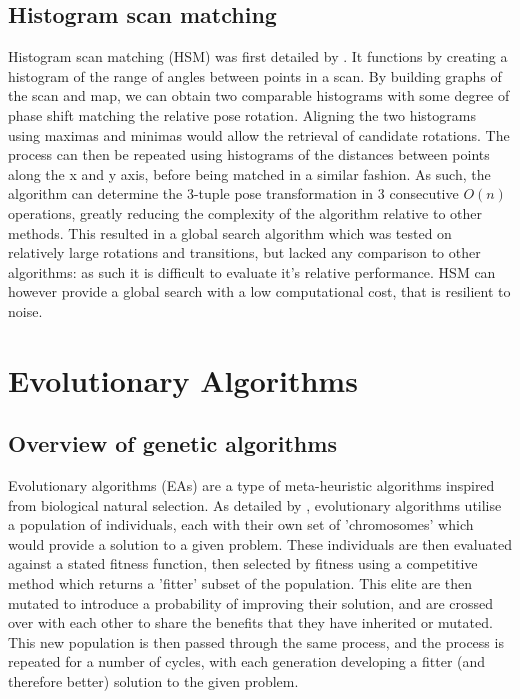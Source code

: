 \documentclass[authoryearcitations]{UoYCSproject}
\begin{document}
\subsection{Histogram scan matching}
Histogram scan matching (HSM) was first detailed by \citet{Weiss1994-ub}. It functions by creating a histogram of the range of angles between points in a scan. By building graphs of the scan and map, we can obtain two comparable histograms with some degree of phase shift matching the relative pose rotation. Aligning the two histograms using maximas and minimas would allow the retrieval of candidate rotations. The process can then be repeated using histograms of the distances between points along the x and y axis, before being matched in a similar fashion. As such, the algorithm can determine the 3-tuple pose transformation in 3 consecutive $O(n)$ operations, greatly reducing the complexity of the algorithm relative to other methods. This resulted in a global search algorithm which was tested on relatively large rotations and transitions, but lacked any comparison to other algorithms: as such it is difficult to evaluate it's relative performance. HSM can however provide a global search with a low computational cost, that is resilient to noise.

\section{Evolutionary Algorithms}
\label{sec:evo_approaches}
\subsection{Overview of genetic algorithms}
Evolutionary algorithms (EAs) are a type of meta-heuristic algorithms inspired from biological natural selection. As detailed by \citet{Whitley1994-tx}, evolutionary algorithms utilise a population of individuals, each with their own set of 'chromosomes' which would provide a solution to a given problem. These individuals are then evaluated against a stated fitness function, then selected by fitness using a competitive method which returns a 'fitter' subset of the population. This elite are then mutated to introduce a probability of improving their solution, and are crossed over with each other to share the benefits that they have inherited or mutated. This new population is then passed through the same process, and the process is repeated for a number of cycles, with each generation developing a fitter (and therefore better) solution to the given problem. 
\end{document}
